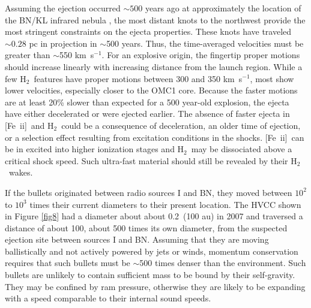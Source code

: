 \documentclass{aa}
\newcommand{\kms}{km~s{$^{-1}$}}
\newcommand{\Feii}{[Fe~{\sc ii}]}
\newcommand{\hh}{\ensuremath{\textrm{H}_{2}}}			%
\begin{document}
Assuming the ejection occurred $\sim500$ years ago at approximately the
location of the BN/KL infrared nebula 
\citep{BallyZinnecker2005,Zapata2009,Bally2011,Goddi2011},
the most distant knots to the northwest provide the most stringent 
constraints on the ejecta properties.    These knots have traveled
$\sim0.28$ pc in projection in $\sim$500 years.  Thus,  the time-averaged 
velocities must be greater than  $\sim$550 \kms.   For an explosive origin, 
the fingertip proper motions should increase linearly with increasing distance 
from the launch region.    While a few \hh\ features have proper motions between 300
and 350 \kms ,  most show lower velocities, especially closer to the OMC1 core.   
Because the faster motions are at least 20\% slower than expected for a 500 
year-old explosion,   the ejecta  have either decelerated or were ejected earlier.   
The absence of faster ejecta in \Feii\  and \hh\  could be a consequence of deceleration,
an older time of ejection, or a selection effect resulting from excitation 
conditions in the shocks.       \Feii\ can be in excited into higher ionization stages and 
\hh\  may be dissociated above a critical shock speed.     Such ultra-fast  
material  should  still be revealed by their \hh\  wakes.  

If the bullets  originated  between radio sources I and BN,  they moved 
between $10^2$ to $10^3$ times their current diameters  to their present location.
The HVCC shown  in Figure \ref{fig8} had a  diameter about about 
0.2\arcsec\ (100 au) in 2007 and traversed a distance of about 100\arcsec ,  
about 500 times its own diameter,  from the suspected ejection site between 
sources I and BN.     Assuming that they are moving ballistically and not actively 
powered by  jets or winds, momentum conservation requires that such bullets must 
be $\sim$500 times  denser than the environment.    Such bullets are unlikely to 
contain sufficient mass to be bound by their self-gravity.   They may be confined 
by ram pressure, otherwise they are  likely to be expanding with a speed 
comparable to their  internal sound speeds.    
\end{document}

